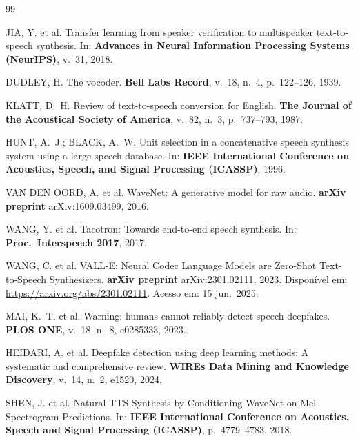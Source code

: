 \documentclass[12pt,a4paper]{article}
\begin{document}
\begingroup
\singlespacing
\setlength{\parindent}{0pt}
\setlength{\parskip}{0.5em}
\FloatBarrier
\clearpage
\begin{thebibliography}{99}
	
	JIA, Y. et al.
	Transfer learning from speaker verification to multispeaker text-to-speech
	synthesis.
	In: \textbf{Advances in Neural Information Processing Systems (NeurIPS)},
	v.~31, 2018.
	
	DUDLEY, H.
	The vocoder.
	\textbf{Bell Labs Record},
	v.~18, n.~4, p.~122--126, 1939.
	
	KLATT, D.~H.
	Review of text-to-speech conversion for English.
	\textbf{The Journal of the Acoustical Society of America},
	v.~82, n.~3, p.~737--793, 1987.
	
	HUNT, A.~J.; BLACK, A.~W.
	Unit selection in a concatenative speech synthesis system using a large
	speech database.
	In: \textbf{IEEE International Conference on Acoustics, Speech, and Signal
		Processing (ICASSP)}, 1996.
	
	VAN DEN OORD, A. et al.
	WaveNet: A generative model for raw audio.
	\textbf{arXiv preprint} arXiv:1609.03499, 2016.
	
	WANG, Y. et al.
	Tacotron: Towards end-to-end speech synthesis.
	In: \textbf{Proc.\ Interspeech 2017}, 2017.
	
	WANG, C. et al.
	VALL-E: Neural Codec Language Models are Zero-Shot Text-to-Speech Synthesizers.
	\textbf{arXiv preprint} arXiv:2301.02111, 2023.
	Disponível em: \url{https://arxiv.org/abs/2301.02111}.
	Acesso em: 15 jun.\ 2025.
	
	MAI, K.~T. et al.
	Warning: humans cannot reliably detect speech deepfakes.
	\textbf{PLOS ONE},
	v.~18, n.~8, e0285333, 2023.
	
	HEIDARI, A. et al.
	Deepfake detection using deep learning methods: A systematic and comprehensive
	review.
	\textbf{WIREs Data Mining and Knowledge Discovery},
	v.~14, n.~2, e1520, 2024.
	
	SHEN, J. et al.
	Natural TTS Synthesis by Conditioning WaveNet on Mel Spectrogram Predictions.
	In: \textbf{IEEE International Conference on Acoustics, Speech and Signal
		Processing (ICASSP)}, p.~4779--4783, 2018.
	

\end{thebibliography}
\end{document}

